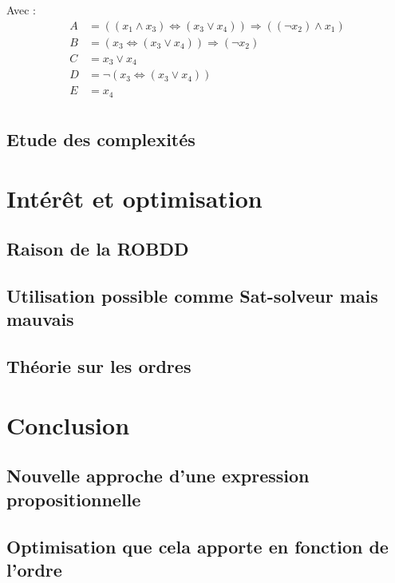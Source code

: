 \documentclass[a4paper, oneside]{report}
\begin{document}
Avec :\\
\begin{equation}
\begin{aligned}
A & = ((x_1 \wedge x_3) \Leftrightarrow (x_3 \vee x_4)) \Rightarrow ((\neg x_2) \wedge x_1)\\
B & = (x_3 \Leftrightarrow (x_3 \vee x_4)) \Rightarrow (\neg x_2)\\
C & = x_3 \vee x_4                                              \\
D & = \neg (x_3 \Leftrightarrow (x_3 \vee x_4))                  \\
E & = x_4\\
\end{aligned}
\end{equation}


\section{Etude des complexités}

\chapter{Intérêt et optimisation}

\section{Raison de la ROBDD}
\section{Utilisation possible comme Sat-solveur mais mauvais}
\section{Théorie sur les ordres}

\chapter*{Conclusion}

\section*{Nouvelle approche d'une expression propositionnelle}
\section*{Optimisation que cela apporte en fonction de l'ordre}
\end{document}
